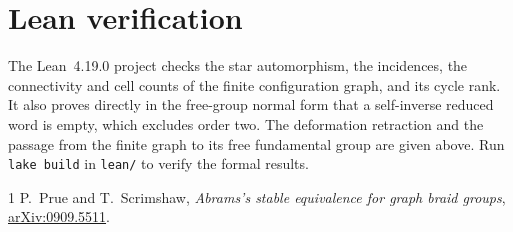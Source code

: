 \documentclass[11pt]{article}
\begin{document}
\section*{Lean verification}

The Lean~4.19.0 project checks the star automorphism, the incidences,
the connectivity and cell counts of the finite configuration graph,
and its cycle rank. It also proves directly in the free-group normal
form that a self-inverse reduced word is empty, which excludes order
two. The deformation retraction and the passage from the finite
graph to its free fundamental group are given above. Run
\verb|lake build| in \verb|lean/| to verify the formal results.

\begin{thebibliography}{1}
P.~Prue and T.~Scrimshaw,
\emph{Abrams's stable equivalence for graph braid groups},
\href{https://arxiv.org/abs/0909.5511}{arXiv:0909.5511}.
\end{thebibliography}
\end{document}
